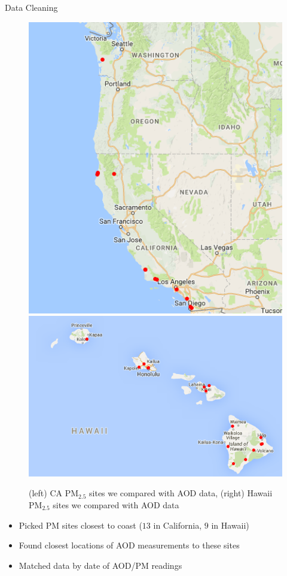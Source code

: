 \documentclass[notheorems,envcountsect,allowframebreaks,xcolor=svgnames,8pt]{beamer}
\begin{document}
\begin{frame}{Data Cleaning}
\begin{figure}[H]
\centering
\includegraphics[scale=0.25]{figs/pm13.png} 
\hspace{1mm}
\includegraphics[scale=0.3]{figs/mappmsiteshawaii.jpg}
\caption{(left) CA PM$_{2.5}$ sites we compared with AOD data, (right) Hawaii PM$_{2.5}$ sites we compared with AOD data}
\end{figure}

\begin{itemize}
\item Picked PM sites closest to coast ($13$ in California, $9$ in Hawaii)
\item Found closest locations of AOD measurements to these sites
\item Matched data by date of AOD/PM readings

\end{itemize}
\end{frame}
\end{document}
